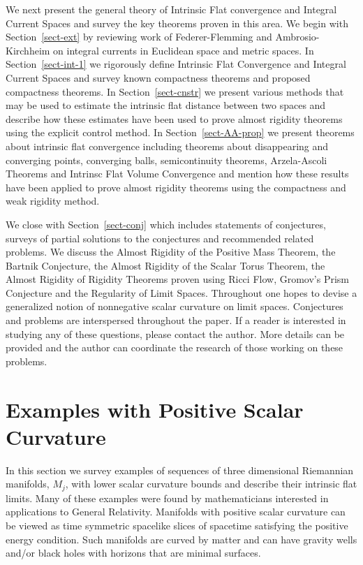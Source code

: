 \documentclass[12pt]{amsart}
\begin{document}
We next present the general theory of
Intrinsic Flat convergence and Integral Current Spaces and
survey the key theorems proven in this area.  We begin with
Section~\ref{sect-ext} by reviewing
work of Federer-Flemming and Ambrosio-Kirchheim on integral currents
in Euclidean space and metric spaces. 
In Section~\ref{sect-int-1} we rigorously define Intrinsic Flat Convergence
and Integral Current Spaces and survey known compactness theorems and proposed compactness theorems.   In Section~\ref{sect-cnstr} we present various methods that
may be used to estimate the intrinsic flat distance between two
spaces and describe how these estimates have been used to
prove almost rigidity theorems using the explicit control method.
In Section~\ref{sect-AA-prop} we present theorems about intrinsic flat convergence including theorems about disappearing and
converging points, converging balls, semicontinuity theorems,
Arzela-Ascoli Theorems and Intrinsc Flat Volume Convergence and mention
how these results have been applied to prove almost rigidity theorems using the
compactness and weak rigidity method. 

We close with Section~\ref{sect-conj} which includes statements of conjectures, surveys of partial solutions to the conjectures and recommended related problems.  We discuss the Almost Rigidity of the Positive Mass Theorem, the Bartnik
Conjecture, the Almost Rigidity of the Scalar Torus Theorem, the Almost Rigidity of Rigidity Theorems proven using Ricci Flow, Gromov's Prism Conjecture
and the Regularity of Limit Spaces.   Throughout one hopes to devise a generalized notion of nonnegative scalar curvature on limit spaces. 
Conjectures and problems are interspersed throughout the paper.
If a reader is interested in studying any of these questions, please contact the author.   More details can be provided and the author can coordinate the research of those working on these problems.  

\section{Examples with Positive Scalar Curvature} \label{sect-ex}

In this section we survey examples of sequences of three
dimensional Riemannian manifolds, $M_j$, with lower scalar curvature 
bounds and describe their intrinsic
flat limits.  Many of these examples were found by mathematicians
interested in applications to General Relativity.
Manifolds with positive scalar curvature can be viewed as time
symmetric spacelike slices of spacetime satisfying the positive 
energy condition.   Such manifolds are curved by matter and
can have gravity wells and/or black holes with horizons that
are minimal surfaces.   
\end{document}
